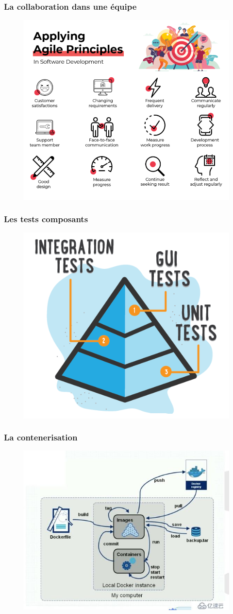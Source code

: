 \begin{frame}
    \frametitle{La collaboration dans une équipe}

    \begin{figure}
        \centering
        \includegraphics[height=0.5\linewidth]{figures/introduction/agile}
        \label{fig:collaboration}
    \end{figure}
\end{frame}

\begin{frame}
    \frametitle{Les tests composants}

    \begin{figure}
        \centering
        \includegraphics[height=0.5\linewidth]{figures/introduction/tests}
        \label{fig:tests}
    \end{figure}
\end{frame}

\begin{frame}
    \frametitle{La contenerisation}

    \begin{figure}
        \centering
        \includegraphics[height=0.5\linewidth]{figures/introduction/docker}
        \label{fig:conteneur}
    \end{figure}
\end{frame}

